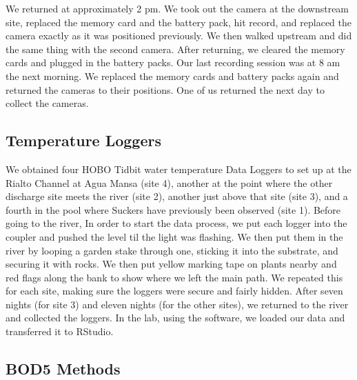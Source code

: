 \documentclass{article}\usepackage[]{graphicx}\usepackage[]{color}
\begin{document}
We returned at approximately 2 pm.  We took out the camera at the downstream site, replaced the memory card and the battery pack, hit record, and replaced the camera exactly as it was positioned previously.  We then walked upstream and did the same thing with the second camera.  After returning, we cleared the memory cards and plugged in the battery packs.
Our last recording session was at 8 am the next morning.  We replaced the memory cards and battery packs again and returned the cameras to their positions.  One of us returned the next day to collect the cameras.

\subsection{Temperature Loggers}
We obtained four HOBO Tidbit water temperature Data Loggers to set up at the Rialto Channel at Agua Mansa (site 4), another at the point where the other discharge site meets the river (site 2), another just above that site (site 3), and a fourth in the pool where Suckers have previously been observed (site 1). Before going to the river, In order to start the data process, we put each logger into the coupler and pushed the level til the light was flashing. We then put them in the river by looping a garden stake through one, sticking it into the substrate, and securing it with rocks. We then put yellow marking tape on plants nearby and red flags along the bank to show where we left the main path. We repeated this for each site, making sure the loggers were secure and fairly hidden. After seven nights (for site 3) and eleven nights (for the other sites), we returned to the river and collected the loggers. In the lab, using the software, we loaded our data and transferred it to RStudio.

\subsection{BOD5 Methods}
\end{document}
